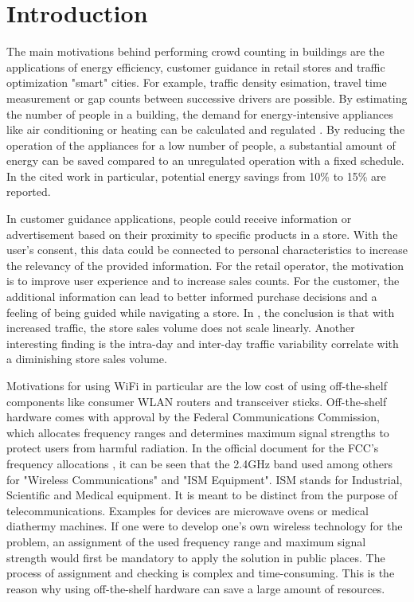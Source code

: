 \documentclass[conference]{IEEEtran}
\begin{document}
\section{Introduction}
The main motivations behind performing crowd counting in buildings are the applications of energy efficiency, customer guidance in retail stores and traffic optimization "smart" cities. For example, traffic density esimation, travel time measurement or gap counts between successive drivers are possible. By estimating the number of people in a building, the demand for energy-intensive appliances like air conditioning or heating can be calculated and regulated \cite{Agarwal}. By reducing the operation of the appliances for a low number of people, a substantial amount of energy can be saved compared to an unregulated operation with a fixed schedule. In the cited work in particular, potential energy savings from 10\% to 15\% are reported.
\par
In customer guidance applications, people could receive information or advertisement based on their proximity to specific products in a store. With the user's consent, this data could be connected to personal characteristics to increase the relevancy of the provided information. For the retail operator, the motivation is to improve user experience and to increase sales counts. For the customer, the additional information can lead to better informed purchase decisions and a feeling of being guided while navigating a store.
In \cite{RetailStores}, the conclusion is that with increased traffic, the store sales volume does not scale linearly. Another interesting finding is the intra-day and inter-day traffic variability correlate with a diminishing store sales volume.
\par
Motivations for using WiFi in particular are the low cost of using off-the-shelf components like consumer WLAN routers and transceiver sticks. Off-the-shelf hardware comes with approval by the Federal Communications Commission, which allocates frequency ranges and determines maximum signal strengths to protect users from harmful radiation. In the official document for the FCC's frequency allocations \cite{fcctable}, it can be seen that the 2.4GHz band used among others for "Wireless Communications" and "ISM Equipment". ISM stands for Industrial, Scientific and Medical equipment. It is meant to be distinct from the purpose of telecommunications. Examples for devices are microwave ovens or medical diathermy machines.
If one were to develop one's own wireless technology for the problem, an assignment of the used frequency range and maximum signal strength would first be mandatory to apply the solution in public places. The process of assignment and checking is complex and time-consuming. This is the reason why using off-the-shelf hardware can save a large amount of resources.
\end{document}
